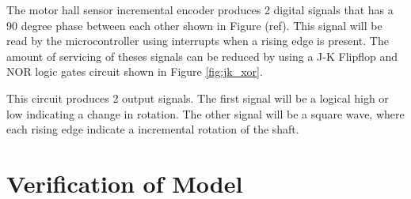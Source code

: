 \documentclass[a4paper,12pt]{article}
\begin{document}
	The motor hall sensor incremental encoder produces 2 digital signals  that has a 90 degree phase between each other shown in Figure (ref). This signal will be read by the microcontroller using interrupts when a rising edge is present. The amount of servicing of theses signals can be reduced by using a J-K Flipflop and NOR logic gates circuit shown in Figure \ref{fig:jk_xor}. 
	
	This circuit produces 2 output signals. The first signal will be a logical high or low indicating a change in rotation. The other signal will be a square wave, where each rising edge indicate a incremental rotation of the shaft. 
	
	
	
	\section{Verification of Model}
	

	\newpage
	
	
	
\end{document}
